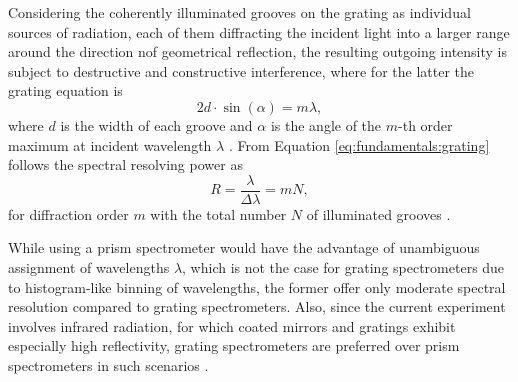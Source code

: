 
\noindent Considering the coherently illuminated grooves on the grating as individual sources of radiation, each of them diffracting the incident light into a larger range around the direction nof geometrical reflection, the resulting outgoing intensity is subject to destructive and constructive interference, where for the latter the grating equation is
\begin{equation}
    \label{eq:fundamentals:grating}
    2 d \cdot \sin(\alpha) = m \lambda ,
\end{equation}
where $d$ is the width of each groove and $\alpha$ is the angle of the $m$-th order maximum at incident wavelength $\lambda$ \cite{demtroder2014laser}. From Equation \ref{eq:fundamentals:grating} follows the spectral resolving power as
\begin{equation}
    \label{eq:fundamentals:resolving}
    R = \frac{\lambda}{\Delta \lambda} = m N ,
\end{equation}
for diffraction order $m$ with the total number $N$ of illuminated grooves \cite{demtroder2014laser}.

While using a prism spectrometer would have the advantage of unambiguous assignment of wavelengths $\lambda$, which is not the case for grating spectrometers due to histogram-like binning of wavelengths, the former offer only moderate spectral resolution compared to grating spectrometers. Also, since the current experiment involves infrared radiation, for which coated mirrors and gratings exhibit especially high reflectivity, grating spectrometers are preferred over prism spectrometers in such scenarios \cite{demtroder2014laser}.

\newpage
